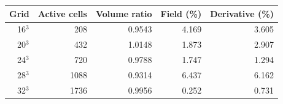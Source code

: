 \begin{center}\begin{tabular}{rrrrr}\toprule
Grid & Active cells & Volume ratio & Field (\%) & Derivative (\%)\\\midrule
16$^3$ & 208 & 0.9543 & 4.169 & 3.605\\
20$^3$ & 432 & 1.0148 & 1.873 & 2.907\\
24$^3$ & 720 & 0.9788 & 1.747 & 1.294\\
28$^3$ & 1088 & 0.9314 & 6.437 & 6.162\\
32$^3$ & 1736 & 0.9956 & 0.252 & 0.731\\
\bottomrule\end{tabular}\end{center}
